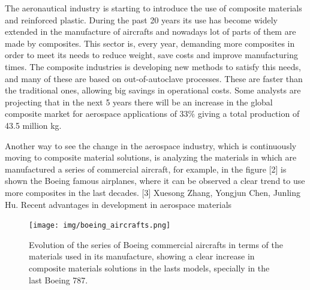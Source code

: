 The aeronautical industry is starting to introduce the use of composite materials
and reinforced plastic. During the past 20 years its use has become widely extended
in the manufacture of aircrafts and nowadays lot of parts of them are made by composites.
This sector is, every year, demanding more composites in order to meet its needs
to reduce weight, save costs and improve manufacturing times. The composite industries
is developing new methods to satisfy this needs, and many of these are based on
out-of-autoclave processes. These are faster than the traditional ones, allowing
big savings in operational costs. Some analysts are projecting that in the next
5 years there will be an increase in the global composite market for aerospace
applications of  33\% giving a total production of 43.5 million kg. \cite{2}

Another way to see the change in the aerospace industry, which is continuously
moving to composite material solutions, is analyzing the materials in which are
manufactured a series of commercial aircraft, for example, in the figure [2] is
shown the Boeing famous airplanes, where it can be observed a clear trend to use
more composites in the last decades\cite{3}.
[3] Xuesong Zhang, Yongjun Chen, Junling Hu. Recent advantages in development in aerospace materials

\begin{figure}[h]
	\centering
	\texttt{[image: img/boeing\_aircrafts.png]}
	\caption[Carbon fiber prepreg roll]{Evolution of the
	series of Boeing commercial aircrafts in terms of the materials used in
	its manufacture, showing a clear increase in composite materials solutions
	in the lasts models, specially in the last Boeing 787. \cite{3}}
	\label{fig:prepreg_roll}
\end{figure}
